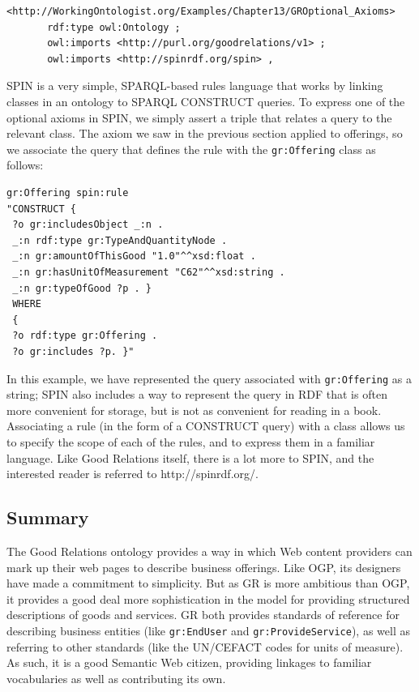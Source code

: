 \begin{lstlisting}
<http://WorkingOntologist.org/Examples/Chapter13/GROptional_Axioms>
       rdf:type owl:Ontology ;
       owl:imports <http://purl.org/goodrelations/v1> ;
       owl:imports <http://spinrdf.org/spin> ,
\end{lstlisting}

SPIN is a very simple, SPARQL-based rules language that works by linking
classes in an ontology to SPARQL CONSTRUCT queries. To express one of
the optional axioms in SPIN, we simply assert a triple that relates a
query to the relevant class. The axiom we saw in the previous section
applied to offerings, so we associate the query that defines the rule
with the \texttt{gr:Offering} class as follows:

\begin{lstlisting}
gr:Offering spin:rule
"CONSTRUCT {
 ?o gr:includesObject _:n .
 _:n rdf:type gr:TypeAndQuantityNode .
 _:n gr:amountOfThisGood "1.0"^^xsd:float .
 _:n gr:hasUnitOfMeasurement "C62"^^xsd:string .
 _:n gr:typeOfGood ?p . }
 WHERE
 {
 ?o rdf:type gr:Offering .
 ?o gr:includes ?p. }"
\end{lstlisting}

In this example, we have represented the query associated with
\texttt{gr:Offering} as a string; SPIN also includes a way to represent the query
in RDF that is often more convenient for storage, but is not as
convenient for reading in a book. Associating a rule (in the form of a
CONSTRUCT query) with a class allows us to specify the scope of each of
the rules, and to express them in a familiar language. Like Good
Relations itself, there is a lot more to SPIN, and the interested reader
is referred to http://spinrdf.org/.

\subsection{Summary}

The Good Relations ontology provides a way in which Web content
providers can mark up their web pages to describe business offerings.
Like OGP, its designers have made a commitment to simplicity. But as GR
is more ambitious than OGP, it provides a good deal more sophistication
in the model for providing structured descriptions of goods and
services. GR both provides standards of reference for describing
business entities (like \texttt{gr:EndUser} and \texttt{gr:ProvideService}), as well as
referring to other standards (like the UN/CEFACT codes for units of
measure). As such, it is a good Semantic Web citizen, providing linkages
to familiar vocabularies as well as contributing its own.

